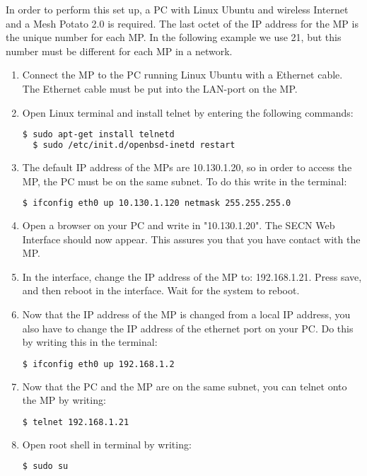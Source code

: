 
In order to perform this set up, a PC with Linux Ubuntu and wireless Internet and a Mesh Potato 2.0 is required. The last octet of the IP address for the MP is the unique number for each MP. In the following example we use 21, but this number must be different for each MP in a network. 

\begin{enumerate}
\item Connect the MP to the PC running Linux Ubuntu with a Ethernet cable. The Ethernet cable must be put into the LAN-port on the MP. 
\item Open Linux terminal and install telnet by entering the following commands: 
\noindent
\begin{lstlisting}[language=bash]
  $ sudo apt-get install telnetd
  $ sudo /etc/init.d/openbsd-inetd restart 
\end{lstlisting}
\item The default IP address of the MPs are 10.130.1.20, so in order to access the MP, the PC must be on the same subnet. To do this write in the terminal: 
\noindent
\begin{lstlisting}[language=bash]
  $ ifconfig eth0 up 10.130.1.120 netmask 255.255.255.0
\end{lstlisting}
\item Open a browser on your PC and write in "10.130.1.20". The SECN Web Interface should now appear. This assures you that you have contact with the MP.
\item In the interface, change the IP address of the MP to: 192.168.1.21. Press save, and then reboot in the interface. Wait for the system to reboot. 
\item Now that the IP address of the MP is changed from a local IP address, you also have to change the IP address of the ethernet port on your PC. Do this by writing this in the terminal:
\noindent
\begin{lstlisting}[language=bash]
  $ ifconfig eth0 up 192.168.1.2
\end{lstlisting}
\item Now that the PC and the MP are on the same subnet, you can telnet onto the MP by writing: 
\noindent
\begin{lstlisting}[language=bash]
  $ telnet 192.168.1.21
\end{lstlisting}
\item Open root shell in terminal by writing: 
\noindent
\begin{lstlisting}[language=bash]
  $ sudo su
\end{lstlisting}

\end{enumerate}
